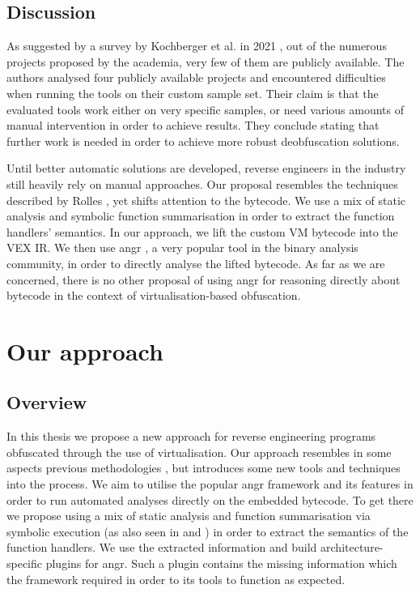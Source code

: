 \section{Discussion}

As suggested by a survey by Kochberger et al. in 2021 \cite{kochberger2021sok}, out of the numerous projects proposed by the academia, very few of them are publicly available. The authors analysed four publicly available projects and encountered difficulties when running the tools on their custom sample set. Their claim is that the evaluated tools work either on very specific samples, or need various amounts of manual intervention in order to achieve results. They conclude stating that further work is needed in order to achieve more robust deobfuscation solutions.

Until better automatic solutions are developed, reverse engineers in the industry still heavily rely on manual approaches. Our proposal resembles the techniques described by Rolles \cite{rolles2009unpacking}, yet shifts attention to the bytecode. We use a mix of static analysis and symbolic function summarisation in order to extract the function handlers' semantics. In our approach, we lift the custom \gls{VM} bytecode into the VEX \gls{IR}. We then use angr \cite{angr}, a very popular tool in the binary analysis community, in order to directly analyse the lifted bytecode. As far as we are concerned, there is no other proposal of using angr for reasoning directly about bytecode in the context of virtualisation-based obfuscation.

\chapter{Our approach}

\section{Overview}

In this thesis we propose a new approach for reverse engineering programs obfuscated through the use of virtualisation. Our approach resembles in some aspects previous methodologies \cite{rolles2009unpacking}, but introduces some new tools and techniques into the process. We aim to utilise the popular angr framework and its features in order to run automated analyses directly on the embedded bytecode. To get there we propose using a mix of static analysis and function summarisation via symbolic execution (as also seen in \cite{symbolic_deobf_2018} and \cite{liang2018}) in order to extract the semantics of the function handlers. We use the extracted information and build architecture-specific plugins for angr. Such a plugin contains the missing information which the framework required in order to its tools to function as expected.

